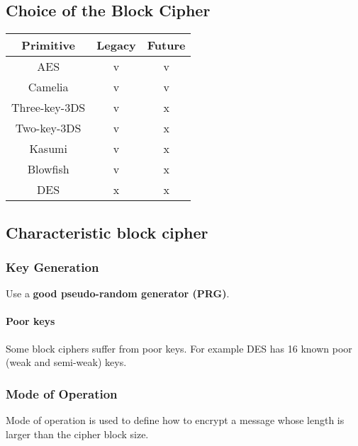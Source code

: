 
\subsection{Choice of the Block Cipher}
\begin{center}
    \begin{tabular}{|c|c|c|}
        \hline
        \textbf{Primitive} & \textbf{Legacy} & \textbf{Future} \\
        \hline
        AES & \textcolor{green!50!black}{v} &
        \textcolor{green!50!black}{v} \\
        Camelia & \textcolor{green!50!black}{v} &
        \textcolor{green!50!black}{v} \\
        \hline
        Three-key-3DS & \textcolor{green!50!black}{v} &
        \textcolor{red!50!black}{x} \\
        Two-key-3DS & \textcolor{green!50!black}{v} &
        \textcolor{red!50!black}{x} \\
        Kasumi & \textcolor{green!50!black}{v} &
        \textcolor{red!50!black}{x} \\
        Blowfish & \textcolor{green!50!black}{v} &
        \textcolor{red!50!black}{x} \\
        \hline
        DES & \textcolor{red!50!black}{x} & \textcolor{red!50!black}{x}\\
        \hline
    \end{tabular}
\end{center}

\subsection{Characteristic block cipher}

\subsubsection{Key Generation}
Use a \textbf{good pseudo-random generator (PRG)}.

\paragraph{Poor keys}
Some block ciphers suffer from poor keys. For example DES has 16 known poor
(weak and semi-weak) keys. 

\subsubsection{Mode of Operation} 
Mode of operation is used to define how to encrypt a message whose length
is larger than the cipher block size.

